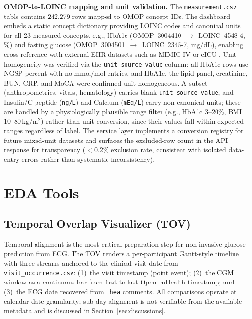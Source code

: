 \documentclass[conference]{IEEEtran}
\begin{document}
\textbf{OMOP-to-LOINC mapping and unit validation.} The \texttt{measurement.csv} table \cite{noauthor_omop_nodate} contains 242,279 rows mapped to OMOP concept IDs. The dashboard embeds a static concept dictionary providing LOINC codes and canonical units for all 23 measured concepts, e.g., HbA1c (OMOP~3004410~$\to$~LOINC~4548-4, \%) and fasting glucose (OMOP~3004501~$\to$~LOINC~2345-7, mg/dL), enabling cross-reference with external EHR datasets such as MIMIC-IV \cite{johnson_mimic_2023} or eICU \cite{pollard_eicu_2018}. Unit homogeneity was verified via the \texttt{unit\_source\_value} column: all HbA1c rows use NGSP percent with no mmol/mol entries, and HbA1c, the lipid panel, creatinine, BUN, CRP, and MoCA were confirmed unit-homogeneous. A subset (anthropometrics, vitals, hematology) carries blank \texttt{unit\_source\_value}, and Insulin/C-peptide (\texttt{ng/L}) and Calcium (\texttt{mEq/L}) carry non-canonical units; these are handled by a physiologically plausible range filter (e.g., HbA1c 3--20\%, BMI 10--80\,kg/m$^2$) rather than unit conversion, since their values fall within expected ranges regardless of label. The service layer implements a conversion registry for future mixed-unit datasets and surfaces the excluded-row count in the API response for transparency ($<$0.2\% exclusion rate, consistent with isolated data-entry errors rather than systematic inconsistency).

\section{EDA Tools}
\label{sec:eda}

\subsection{Temporal Overlap Visualizer (TOV)}
\label{sec:temporal_overlap_visualizer}
Temporal alignment is the most critical preparation step for non-invasive glucose prediction from ECG. The TOV renders a per-participant Gantt-style timeline with three streams anchored to the clinical-visit date from \texttt{visit\_occurrence.csv}: (1)~the visit timestamp (point event); (2)~the CGM window as a continuous bar from first to last Open~mHealth timestamp; and (3)~the ECG date recovered from \texttt{.hea} comments. All comparisons operate at calendar-date granularity; sub-day alignment is not verifiable from the available metadata and is discussed in Section~\ref{sec:discussions}.
\end{document}
